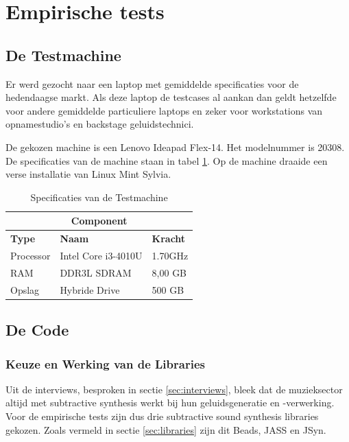 \section{Empirische tests}
\label{sec:methodologie:empirischetests}

\subsection{De Testmachine}
\label{subsec:methodologie:testmachine}

Er werd gezocht naar een laptop met gemiddelde specificaties voor de hedendaagse markt. Als deze laptop de testcases al aankan dan geldt hetzelfde voor andere gemiddelde particuliere laptops en zeker voor workstations van opnamestudio's en backstage geluidstechnici.

De gekozen machine is een Lenovo Ideapad Flex-14. Het modelnummer is 20308. De specificaties van de machine staan in tabel \ref{tab:specmachine}. Op de machine draaide een verse installatie van Linux Mint Sylvia.

\begin{table}[]
\centering
\begin{tabular}{lll}
\hline
\multicolumn{3}{c}{\textbf{Component}}                \\ \hline
\textbf{Type} & \textbf{Naam}       & \textbf{Kracht} \\ \hline
Processor     & Intel Core i3-4010U & 1.70GHz         \\ \hline
RAM           & DDR3L SDRAM         & 8,00 GB         \\ \hline
Opslag        & Hybride Drive       & 500 GB
\end{tabular}
\caption{Specificaties van de Testmachine}
\label{tab:specmachine}
\end{table}

\subsection{De Code}
\label{subsec:methodologie:code}

\subsubsection{Keuze en Werking van de Libraries}

Uit de interviews, besproken in sectie \ref{sec:interviews}, bleek dat de muzieksector altijd met subtractive synthesis werkt bij hun geluidsgeneratie en -verwerking. Voor de empirische tests zijn dus drie subtractive sound synthesis libraries gekozen. Zoals vermeld in sectie \ref{sec:libraries} zijn dit Beads, JASS en JSyn.


